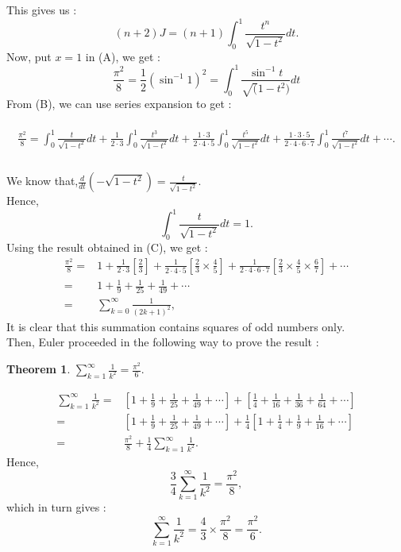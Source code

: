 \documentclass[a4paper,reqno,11pt]{book}
\theoremstyle{plain}%
\newtheorem{thm}{Theorem}[chapter]
\theoremstyle{definition}
\begin{document}
This gives us :\\
$$(n+2)J = (n+1)\int_{0}^{1} \frac{t^{n}}{\sqrt{1-t^2}} dt.$$
Now, put $x=1$ in (A), we get :
$$ \frac{\pi^2}{8} = \frac{1}{2}(\sin^{-1}1)^2 = \int_{0}^{1} \frac{\sin^{-1}t}{\sqrt(1-t^2)}dt $$
From (B), we can use series expansion to get :\\
\\
\begin{eqnarray*}
\frac{\pi^2}{8} = \int_{0}^{1}\frac{t}{\sqrt{1-t^2}}dt + \frac{1}{2\cdot3}\int_{0}^{1}\frac{t^3}{\sqrt{1-t^2}}dt + \frac{1\cdot3}{2\cdot4\cdot5}\int_{0}^{1}\frac{t^5}{\sqrt{1-t^2}}dt + \frac{1\cdot3\cdot5}{2\cdot4\cdot6\cdot7}\int_{0}^{1}\frac{t^7}{\sqrt{1-t^2}}dt +\cdots.\\
\end{eqnarray*}
\\
We know that,$\frac{d}{dt}(-\sqrt{1-t^2}) = \frac{t}{\sqrt{1-t^2}}.$\\
Hence,\\
$$\int_{0}^{1} \frac{t}{\sqrt{1-t^2}}dt = 1.$$
Using the result obtained in (C), we get :\\
\begin{align*}
\frac{\pi^2}{8} =& 1 + \frac{1}{2\cdot3}\left[\frac{2}{3}\right] + \frac{1}{2\cdot4\cdot5}\left[\frac{2}{3} \times \frac{4}{5}\right] + \frac{1}{2\cdot4\cdot6\cdot7}\left[\frac{2}{3} \times \frac{4}{5} \times \frac{6}{7}\right] + \cdots\\
=& 1 + \frac{1}{9} + \frac{1}{25} + \frac{1}{49} + \cdots\\
=& \sum_{k=0}^{\infty}\frac{1}{(2k+1)^2},
\end{align*}
It is clear that this summation contains squares of odd numbers only.\\
Then, Euler proceeded in the following way to prove the result :\\
\begin{thm}\label{thm : Type 3} $\sum_{k=1}^{\infty}\frac{1}{k^2} = \frac{\pi^2}{6}.$\\
\end{thm}
\begin{Proof}
\begin{align*}
\sum_{k=1}^{\infty}\frac{1}{k^2} =& \left[1 + \frac{1}{9} + \frac{1}{25} + \frac{1}{49} + \cdots\right] + \left[\frac{1}{4} + \frac{1}{16} + \frac{1}{36} + \frac{1}
{64} + \cdots\right]\\
=& \left[1 + \frac{1}{9} + \frac{1}{25} + \frac{1}{49} + \cdots\right] + \frac{1}{4}\left[1 + \frac{1}{4} + \frac{1}{9} + \frac{1}{16} + \cdots\right]\\
=& \frac{\pi^2}{8} + \frac{1}{4}\sum_{k=1}^{\infty}\frac{1}{k^2}.
\end{align*}
Hence, \\
$$\frac{3}{4}\sum_{k=1}^{\infty}\frac{1}{k^2} = \frac{\pi^2}{8},$$
which in turn gives :
$$\sum_{k=1}^{\infty}\frac{1}{k^2} = \frac{4}{3} \times \frac{\pi^2}{8} = \frac{\pi^2}{6}.$$
\end{Proof}
\end{document}
